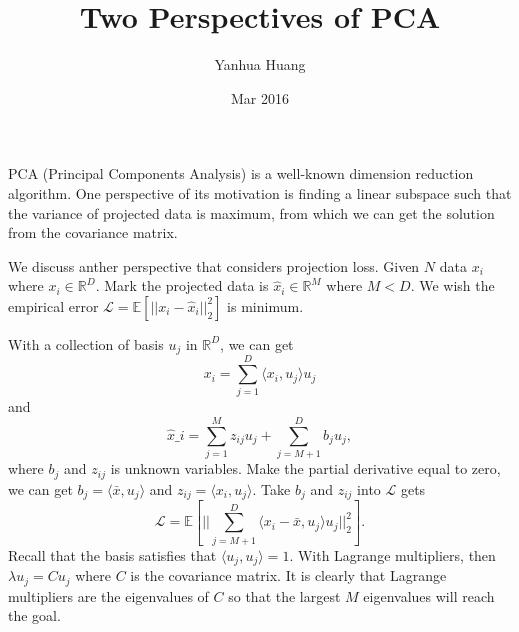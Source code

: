 \documentclass[a4paper,11pt]{article}
\begin{document}
\title{Two Perspectives of PCA}
\author{Yanhua Huang}
\date{Mar 2016}
\maketitle

PCA (Principal Components Analysis) is a well-known dimension reduction algorithm. One perspective of its motivation is finding a linear subspace such that the variance of projected data is maximum, from which we can get the solution from the covariance matrix.

We discuss anther perspective that considers projection loss. Given $N$ data $x_i$ where $x_i \in \mathbb{R}^{D}$. Mark the projected data is $\hat{x}_i \in \mathbb{R}^{M}$ where $M < D$. We wish the empirical error $\mathcal{L} = \mathbb{E}[||x_i - \hat{x}_i||_2^2]$ is minimum.

With a collection of basis $u_j$ in $\mathbb{R}^{D}$, we can get 
\begin{equation}
x_i = \sum_{j=1}^{D}{\langle x_i, u_j \rangle u_j}
\end{equation}
and 
\begin{equation}
\hat{x}\_i = \sum_{j=1}^M{z_{ij} u_j} + \sum_{j=M+1}^D{b_j u_j},
\end{equation}
where $b_j$ and $z_{ij}$ is unknown variables. Make the partial derivative equal to zero, we can get $b_j = \langle \bar{x}, u_j \rangle$ and $z_{ij} = \langle x_i, u_j \rangle$. Take $b_j$ and $z_{ij}$ into $\mathcal{L}$ gets 
\begin{equation}
\mathcal{L} = \mathbb{E}[||{\sum_{j=M+1}^{D}\langle x_i - \bar{x}, u_j \rangle u_j}||_2^2].
\end{equation}
Recall that the basis satisfies that $\langle u_j, u_j \rangle = 1$. With Lagrange multipliers, then $\lambda u_j = Cu_j$ where $C$ is the covariance matrix. It is clearly that Lagrange multipliers are the eigenvalues of $C$ so that the largest $M$ eigenvalues will reach the goal.
\end{document}
